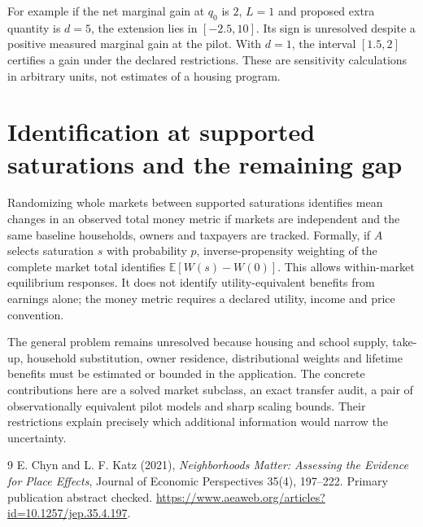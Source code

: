 \documentclass[11pt,a4paper]{article}
\newcommand{\E}{\mathbb E}
\begin{document}
For example if the net marginal gain at $q_0$ is $2$, $L=1$ and proposed extra quantity is $d=5$, the extension lies in $[-2.5,10]$. Its sign is unresolved despite a positive measured marginal gain at the pilot. With $d=1$, the interval $[1.5,2]$ certifies a gain under the declared restrictions. These are sensitivity calculations in arbitrary units, not estimates of a housing program.

\section{Identification at supported saturations and the remaining gap}
Randomizing whole markets between supported saturations identifies mean changes in an observed total money metric if markets are independent and the same baseline households, owners and taxpayers are tracked. Formally, if $A$ selects saturation $s$ with probability $p$, inverse-propensity weighting of the complete market total identifies $\E[W(s)-W(0)]$. This allows within-market equilibrium responses. It does not identify utility-equivalent benefits from earnings alone; the money metric requires a declared utility, income and price convention.

The general problem remains unresolved because housing and school supply, take-up, household substitution, owner residence, distributional weights and lifetime benefits must be estimated or bounded in the application. The concrete contributions here are a solved market subclass, an exact transfer audit, a pair of observationally equivalent pilot models and sharp scaling bounds. Their restrictions explain precisely which additional information would narrow the uncertainty.

\begin{thebibliography}{9}
 E. Chyn and L. F. Katz (2021), \emph{Neighborhoods Matter: Assessing the Evidence for Place Effects}, Journal of Economic Perspectives 35(4), 197--222. Primary publication abstract checked. \url{https://www.aeaweb.org/articles?id=10.1257/jep.35.4.197}.
\end{thebibliography}
\end{document}
